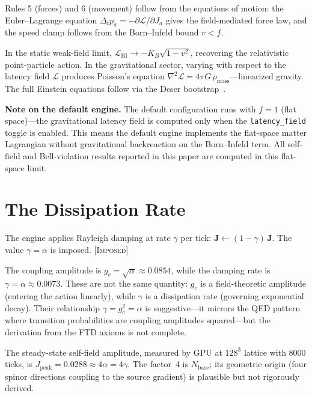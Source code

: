 \documentclass[11pt,a4paper]{article}
\newcommand{\KB}{K_B}
\newcommand{\etag}[1]{{\normalfont\textsc{\footnotesize [#1]}}}
\theoremstyle{compact}
\begin{document}
Rules 5 (forces) and 6 (movement) follow from the equations of motion: the Euler--Lagrange equation $\Delta_t p_a = -\partial\mathcal{L}/\partial J_a$ gives the field-mediated force law, and the speed clamp follows from the Born--Infeld bound $v < f$.

In the static weak-field limit, $\mathcal{L}_{\mathrm{BI}} \to -\KB\sqrt{1 - v^2}$, recovering the relativistic point-particle action. In the gravitational sector, varying with respect to the latency field $\mathcal{L}$ produces Poisson's equation $\nabla^2 \mathcal{L} = 4\pi G\,\rho_{\mathrm{mass}}$---linearized gravity. The full Einstein equations follow via the Deser bootstrap~\cite{deser}.

\smallskip
\noindent\textbf{Note on the default engine.} The default configuration runs with $f = 1$ (flat space)---the gravitational latency field is computed only when the \texttt{latency\_field} toggle is enabled. This means the default engine implements the flat-space matter Lagrangian without gravitational backreaction on the Born--Infeld term. All self-field and Bell-violation results reported in this paper are computed in this flat-space limit.


\section{The Dissipation Rate}
\label{sec:dissipation}

The engine applies Rayleigh damping at rate $\gamma$ per tick: $\mathbf{J} \leftarrow (1-\gamma)\,\mathbf{J}$. The value $\gamma = \alpha$ is imposed. \etag{Imposed}

The coupling amplitude is $g_c = \sqrt{\alpha} \approx 0.0854$, while the damping rate is $\gamma = \alpha \approx 0.0073$. These are not the same quantity: $g_c$ is a field-theoretic amplitude (entering the action linearly), while $\gamma$ is a dissipation rate (governing exponential decay). Their relationship $\gamma = g_c^2 = \alpha$ is suggestive---it mirrors the QED pattern where transition probabilities are coupling amplitudes squared---but the derivation from the FTD axioms is not complete.

The steady-state self-field amplitude, measured by GPU at $128^3$ lattice with $8000$ ticks, is $J_{\mathrm{peak}} = 0.0288 \approx 4\alpha = 4\gamma$. The factor~4 is $N_{\mathrm{base}}$; its geometric origin (four spinor directions coupling to the source gradient) is plausible but not rigorously derived.
\end{document}
